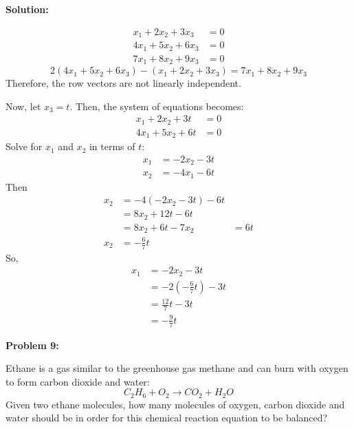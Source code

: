 \documentclass[12pt]{article}
\newenvironment{problem}[1]{
    \textbf{Problem #1:}
}{
    \rmfamily \vspace{1em}
}
\newenvironment{solution}{
    \textbf{Solution:}
    
}{
    
    \vspace{2em}
}
\begin{document}
\begin{solution}
    \[
        \begin{aligned}
            x_1 + 2x_2 + 3x_3 &= 0 \\
            4x_1 + 5x_2 + 6x_3 &= 0 \\
            7x_1 + 8x_2 + 9x_3 &= 0
        \end{aligned}
    \]
    \[
        2(4x_1 + 5x_2 + 6x_3) - (x_1 + 2x_2 + 3x_3) = 7x_1 + 8x_2 + 9x_3
    \]
    Therefore, the row vectors are not linearly independent.

    Now, let $x_3 = t$. Then, the system of equations becomes:
    \[
        \begin{aligned}
            x_1 + 2x_2 + 3t &= 0 \\
            4x_1 + 5x_2 + 6t &= 0
        \end{aligned}
    \]
    Solve for $x_1$ and $x_2$ in terms of $t$:
    \[
        \begin{aligned}
            x_1 &= -2x_2 - 3t \\
            x_2 &= -4x_1 - 6t
        \end{aligned}
    \]
    Then
    \[
        \begin{aligned}
            x_2 &= -4(-2x_2 - 3t) - 6t \\
            &= 8x_2 + 12t - 6t \\
            &= 8x_2 + 6t
            -7x_2 &= 6t \\
            x_2 &= -\frac{6}{7}t
        \end{aligned}
    \]
    So,
    \[
        \begin{aligned}
            x_1 &= -2x_2 - 3t \\
            &= -2(-\frac{6}{7}t) - 3t \\
            &= \frac{12}{7}t - 3t \\
            &= -\frac{9}{7}t
        \end{aligned}
    \]


\end{solution}

\begin{problem}{9}
    Ethane is a gas similar to the greenhouse gas methane and can burn with oxygen to form carbon dioxide and water:
    \[
        C_2H_6 + O_2 \rightarrow CO_2 + H_2O
    \]
    Given two ethane molecules, how many molecules of oxygen, carbon dioxide and water should be in order for this chemical reaction equation to be balanced?
\end{problem}
\end{document}
